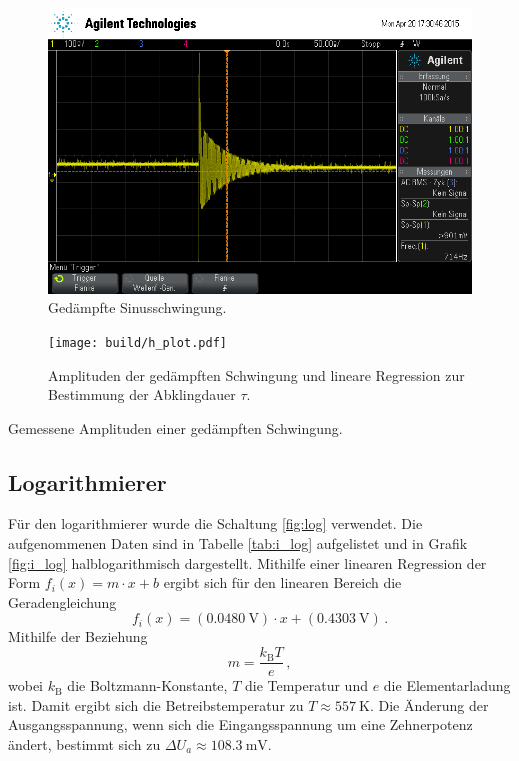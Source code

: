 \begin{figure}[!h]
    \centering
    \includegraphics[width=0.8\linewidth]{data/scope_18.png}
    \caption{Gedämpfte Sinusschwingung.}
    \label{fig:ged_sinus}
\end{figure}

\begin{figure}[!h]
    \centering
    \texttt{[image: build/h\_plot.pdf]}
    \caption{Amplituden der gedämpften Schwingung und lineare Regression zur Bestimmung der Abklingdauer $\tau$.}
    \label{fig:ged_schwing}
\end{figure}

\begin{table}[!h]
    \centering
    \caption{Gemessene Amplituden einer gedämpften Schwingung.}
    \label{tab:ged_schwing}
    

\end{table}

\subsection{Logarithmierer} %
\label{sub:logarithmierer}

Für den logarithmierer wurde die Schaltung \ref{fig:log} verwendet.
Die aufgenommenen Daten sind in Tabelle \ref{tab:i_log} aufgelistet und in Grafik \ref{fig:i_log} halblogarithmisch dargestellt.
Mithilfe einer linearen Regression der Form $f_{i}(x) = m \cdot x + b$ ergibt sich für den linearen Bereich die Geradengleichung
\begin{equation*}
    f_{i}(x) = (\SI{0.0480}{\volt}) \cdot x + (\SI{0.4303}{\volt})\,.
\end{equation*}
Mithilfe der Beziehung
\begin{equation*}
    m = \frac{k_\mathrm{B} T}{e}\,,
\end{equation*}
wobei $k_\mathrm{B}$ die Boltzmann-Konstante, $T$ die Temperatur und $e$ die Elementarladung ist.
Damit ergibt sich die Betreibstemperatur zu $T \approx \SI{557}{\kelvin}$.
Die Änderung der Ausgangsspannung, wenn sich die Eingangsspannung um eine Zehnerpotenz ändert, bestimmt sich zu $\Delta U_a \approx \SI{108.3}{\milli\volt}$.

